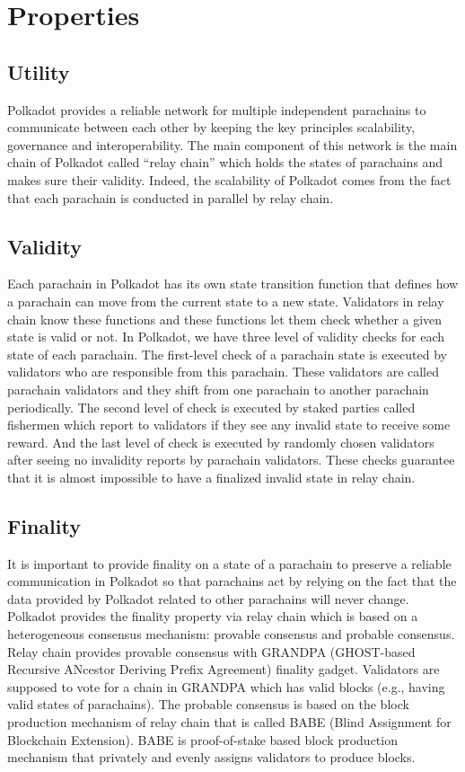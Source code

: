 \section{Properties}

 \subsection{Utility}
 
 Polkadot provides a reliable network for multiple independent parachains to communicate between each other by keeping the key principles scalability, governance and interoperability.  The main component of this network is the main chain of Polkadot called ``relay chain'' which holds the states of parachains and makes sure their validity. Indeed, the scalability of Polkadot comes from the fact that each parachain is conducted in parallel by relay chain. 
 
 \subsection{Validity}
Each parachain in Polkadot has its own state transition function that defines how a parachain can move from the current state to a new state.   Validators in relay chain  know these functions and these functions let them  check whether a given state is valid or not.  In Polkadot, we have three level of validity checks for each state of each parachain. The first-level check of a parachain state is executed by validators who are responsible from this parachain. These validators are called parachain validators and they shift from one parachain to another parachain periodically. The second level of check is executed by staked parties called fishermen which report to validators if they see any invalid state to receive some reward. And the last level of check is executed by randomly chosen validators after seeing no invalidity reports by parachain validators. These checks guarantee that it is almost impossible to have a finalized invalid state in relay chain.

 \subsection{Finality}
 
 
 It is important to provide finality on a state of a parachain to preserve a reliable communication in Polkadot so that parachains act by relying on the fact that the data provided by Polkadot related to other parachains will never change.  Polkadot provides the finality property via relay chain which is based on a heterogeneous consensus mechanism: provable consensus and probable consensus. Relay chain provides provable consensus with GRANDPA (GHOST-based Recursive ANcestor Deriving Prefix Agreement)  finality gadget. Validators are supposed to vote for a chain in GRANDPA  which has valid blocks (e.g., having valid states of parachains). The probable consensus is based on the block production mechanism of relay chain that is called BABE (Blind Assignment for Blockchain Extension). BABE is proof-of-stake based block production mechanism that privately and evenly assigns validators to produce blocks.
 

